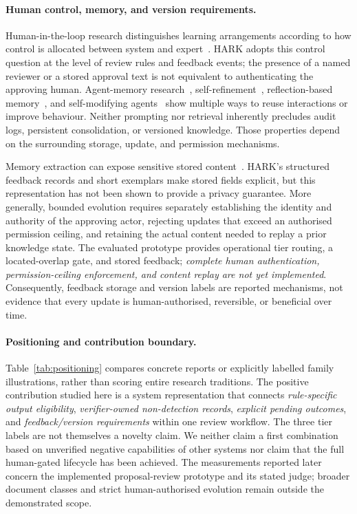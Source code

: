 \paragraph{Human control, memory, and version requirements.}
Human-in-the-loop research distinguishes learning arrangements according to how control is allocated between system and expert~\cite{mosqueira2023}. HARK adopts this control question at the level of review rules and feedback events; the presence of a named reviewer or a stored approval text is not equivalent to authenticating the approving human. Agent-memory research~\cite{wang2024agents}, self-refinement~\cite{madaan2023}, reflection-based memory~\cite{shinn2023}, and self-modifying agents~\cite{zhang2025dgm} show multiple ways to reuse interactions or improve behaviour. Neither prompting nor retrieval inherently precludes audit logs, persistent consolidation, or versioned knowledge. Those properties depend on the surrounding storage, update, and permission mechanisms.

Memory extraction can expose sensitive stored content~\cite{mempriv2025}. HARK's structured feedback records and short exemplars make stored fields explicit, but this representation has not been shown to provide a privacy guarantee. More generally, bounded evolution requires separately establishing the identity and authority of the approving actor, rejecting updates that exceed an authorised permission ceiling, and retaining the actual content needed to replay a prior knowledge state. The evaluated prototype provides operational tier routing, a located-overlap gate, and stored feedback; \emph{complete human authentication, permission-ceiling enforcement, and content replay are not yet implemented}. Consequently, feedback storage and version labels are reported mechanisms, not evidence that every update is human-authorised, reversible, or beneficial over time.

\paragraph{Positioning and contribution boundary.}
Table~\ref{tab:positioning} compares concrete reports or explicitly labelled family illustrations, rather than scoring entire research traditions. The positive contribution studied here is a system representation that connects \emph{rule-specific output eligibility}, \emph{verifier-owned non-detection records}, \emph{explicit pending outcomes}, and \emph{feedback/version requirements} within one review workflow. The three tier labels are not themselves a novelty claim. We neither claim a first combination based on unverified negative capabilities of other systems nor claim that the full human-gated lifecycle has been achieved. The measurements reported later concern the implemented proposal-review prototype and its stated judge; broader document classes and strict human-authorised evolution remain outside the demonstrated scope.

